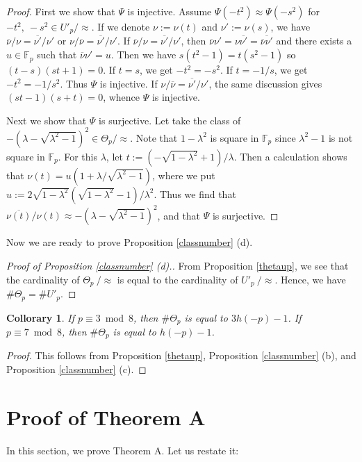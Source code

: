 \documentclass[a4paper, 11pt]{article}
\theoremstyle{plain}
\newtheorem{cor}[defn]{Collorary}
\newcommand{\?}{\textcolor{red}{??}}
\newcommand{\lm}{\lambda}
\newcommand{\fp}{\mathbb{F}_p}
\begin{document}
\begin{proof}
 First we show that $\Psi$ is injective. Assume $\Psi(-t^2) \approx \Psi(-s^2)$ for $-t^2,\ -s^2 \in U'_p/\approx$. If we denote $\nu:=\nu(t)$ and $ {\nu}':=\nu(s)$, we have $\overline{\nu}/\nu=\overline{{\nu}'}/{\nu}' \text{ or } \nu/\overline{\nu}=\overline{{\nu}'}/{\nu}'$. If $\overline{\nu}/\nu=\overline{{\nu}'}/{\nu}'$, then $\overline{\nu}{\nu}'=\nu \overline{{\nu}'}=\overline{\overline{\nu}{\nu}'}$ and there exists a $u\in \fp$ such that $\overline{\nu}{\nu}'=u$. Then we have $s(t^2-1)=t(s^2-1)$ \textcolor{black}{so} $(t-s)(st+1)=0$. If $t=s$, we get $-t^2=-s^2$. If $t=-1/s$, we get $-t^2=-1/s^2$. Thus $\Psi$ is injective. If $\nu/\overline{\nu}=\overline{{\nu}'}/{\nu}'$, the same discussion gives $(st-1)(s+t)=0$, whence $\Psi$ is injective.
 
Next we show that $\Psi$ is surjective. Let take the class of $-(\lm-\sqrt{{\lm}^2-1})^2 \in {\Theta}_p/\approx$.
    Note that $1-{\lm}^2$ is square in $\fp$ since ${\lm}^2-1$ is not square in $\fp$. For this $\lm$, let $t:=(-\sqrt{1-{\lm}^2}+1)/\lm$. Then a calculation shows that $\nu(t)=u( 1+\lm/\sqrt{{\lm}^2-1} )$, where we put $u:=2\sqrt{1-{\lm}^2}(\sqrt{1-{\lm}^2}-1)/{\lm}^2$. Thus we find that $\overline{\nu(t)}/\nu(t) \approx -\left( \lm -\sqrt{{\lm}^2-1} \right)^2$, and that $\Psi$ is surjective.
\end{proof}

  Now we are ready to prove Proposition \ref{classnumber} (d).
\begin{proof}[Proof of Proposition \ref{classnumber} \rm{(d)}.]
    From Proposition \ref{thetaup}, we see that the cardinality of ${\Theta}_p \ /\approx$ is equal to the cardinality of $U'_p \ /\approx$. Hence, we have $\# {\Theta}_p=\# U'_p$.
\end{proof}


\begin{cor}
\label{corsp837}
If $p \equiv 3 \bmod 8$, then $\# {\Theta}_p$ is equal to $3h(-p)-1$. If $p \equiv 7  \bmod 8$, then $\# {\Theta}_p$ is equal to $h(-p)-1$.
\end{cor}
\begin{proof}
    This follows from Proposition \ref{thetaup}, Proposition \ref{classnumber} (b), and Proposition \ref{classnumber} (c).
\end{proof}

\section{Proof of Theorem A}
In this section, we prove Theorem A. Let us restate it:
\end{document}

